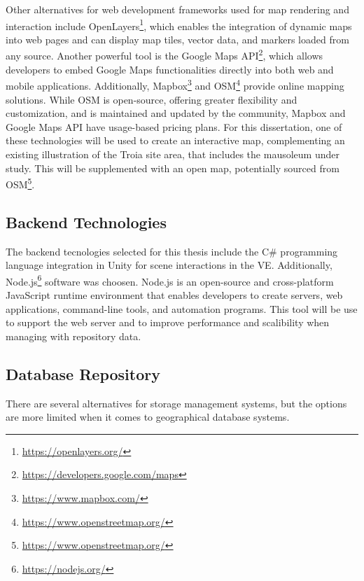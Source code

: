 Other alternatives for web development frameworks used for map rendering and interaction include OpenLayers\footnote{\url{https://openlayers.org/}}, which enables the integration of dynamic maps into web pages and can display map tiles, vector data, and markers loaded from any source.
Another powerful tool is the Google Maps API\footnote{\url{https://developers.google.com/maps}}, which allows developers to embed Google Maps functionalities directly into both web and mobile applications.
Additionally, Mapbox\footnote{\url{https://www.mapbox.com/}} and \gls{OSM}\footnote{\url{https://www.openstreetmap.org/}} provide online mapping solutions. While \gls{OSM} is open-source, offering greater flexibility and customization, and is maintained and updated by the community, Mapbox and Google Maps API have usage-based pricing plans.
For this dissertation, one of these technologies will be used to create an interactive map, complementing an existing illustration of the Troia site area, that includes the mausoleum under study. This will be supplemented with an open map, potentially sourced from \gls{OSM}\footnote{\url{https://www.openstreetmap.org/}}.

\subsection{Backend Technologies}
\label{sec:backend} 

The backend tecnologies selected for this thesis include the C\# programming language integration in Unity for scene interactions in the \gls{VE}.
Additionally, Node.js\footnote{\url{https://nodejs.org/}} software was choosen. Node.js is an open-source and cross-platform JavaScript runtime environment that enables developers to create servers, web applications, command-line tools, and automation programs.
This tool will be use to support the web server and to improve performance and scalibility when managing with repository data.


\subsection{Database Repository}
\label{sec:repos}

There are several alternatives for storage management systems, but the options are more limited when it comes to geographical
database systems.

